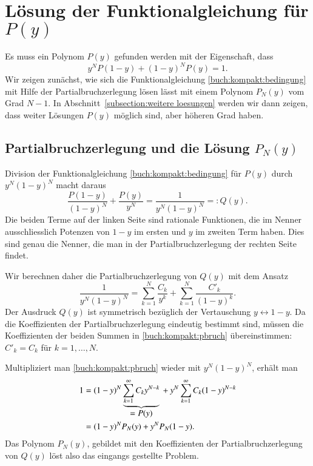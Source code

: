 %
%
%

\section{Lösung der Funktionalgleichung für $P(y)$
\label{section:partialbruch}}
Es muss ein Polynom $P(y)$ gefunden werden mit der Eigenschaft, dass
\begin{equation}
y^N P(1-y) + (1-y)^N P(y) = 1.
\label{buch:kompakt:bedingung}
\end{equation}
Wir zeigen zunächst, wie sich die Funktionalgleichung
\eqref{buch:kompakt:bedingung} mit Hilfe der Partialbruchzerlegung lösen
lässt mit einem Polynom $P_N(y)$ vom Grad $N-1$.
In Abschnitt~\ref{subsection:weitere loesungen} werden wir dann
zeigen, dass weiter Lösungen $P(y)$ möglich sind, aber höheren Grad haben.


\subsection{Partialbruchzerlegung und die Lösung $P_N(y)$}
%
Division der Funktionalgleichung \eqref{buch:kompakt:bedingung} für $P(y)$
durch $y^N(1-y)^N$ macht daraus
\[
\frac{P(1-y)}{(1-y)^N}
+
\frac{P(y)}{y^N}
=
\frac{1}{y^N(1-y)^N}
=:
Q(y).
\]
Die beiden Terme auf der linken Seite sind rationale Funktionen, die im
Nenner ausschliesslich Potenzen von $1-y$ im ersten und $y$ im zweiten
Term haben.
Dies sind genau die Nenner, die man in der Partialbruchzerlegung der rechten
Seite findet.

Wir berechnen daher die Partialbruchzerlegung von $Q(y)$ mit dem Ansatz
\begin{equation}
\frac{1}{y^N(1-y)^N}
=
\sum_{k=1}^N\frac{C_k}{y^k}
+
\sum_{k=1}^N\frac{C'_k}{(1-y)^k}.
\label{buch:kompakt:pbruch}
\end{equation}
Der Ausdruck $Q(y)$ ist symmetrisch bezüglich der Vertauschung
$y\leftrightarrow 1-y$.
Da die Koeffizienten der Partialbruchzerlegung eindeutig bestimmt sind,
müssen die Koeffizienten der beiden Summen in \eqref{buch:kompakt:pbruch}
übereinstimmen: $C'_k=C_k$ für $k=1,\dots,N$.

Multipliziert man \eqref{buch:kompakt:pbruch} wieder mit $y^N(1-y)^N$,
erhält man
\begin{align*}
1
&=
(1-y)^N
\underbrace{\sum_{k=1}^\infty C_k y^{N-k}}_{\displaystyle =P(y)}
\mathstrut
+
y^N
\sum_{k=1}^\infty C_k (1-y)^{N-k}
\\
&=
(1-y)^N
P_N(y)
+
y^N
P_N(1-y).
\end{align*}
Das Polynom $P_N(y)$, gebildet mit den Koeffizienten der Partialbruchzerlegung
von $Q(y)$ löst also das eingangs gestellte Problem.

